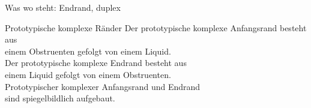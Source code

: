 \begin{frame}
  {Was wo steht: Endrand, duplex}
  \pause
  \Zeile
\end{frame}

\begin{frame}
  {Prototypische komplexe Ränder}
  \pause
  \Zeile
  \Large
  \centering
  Der prototypische komplexe Anfangsrand besteht aus\\
  \alert{einem Obstruenten gefolgt von einem Liquid}.\\
  \Zeile
  \pause
  Der prototypische komplexe Endrand besteht aus\\
  \alert{einem Liquid gefolgt von einem Obstruenten}.\\
  \pause
  \Zeile
  Prototypischer komplexer Anfangsrand und Endrand\\
  sind \alert{spiegelbildlich} aufgebaut.
\end{frame}


